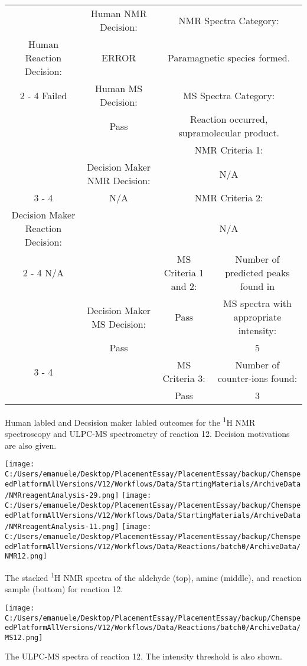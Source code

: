\documentclass{article}%
\begin{document}
\begin{Decision Table}[H]%
\begin{tabular}{|c|c|c|c|}%
\hline%
&Human NMR Decision:&\multicolumn{2}{|c|}{NMR Spectra Category:}\\%
Human Reaction Decision:&ERROR&\multicolumn{2}{|c|}{Paramagnetic species formed.}\\%
\cline{2%
-%
4}%
Failed&Human MS Decision:&\multicolumn{2}{|c|}{MS Spectra Category:}\\%
&Pass&\multicolumn{2}{|c|}{Reaction occurred, supramolecular product.}\\%
\hline%
&&\multicolumn{2}{|c|}{NMR Criteria 1:}\\%
&Decision Maker NMR Decision:&\multicolumn{2}{|c|}{N/A}\\%
\cline{3%
-%
4}%
&N/A&\multicolumn{2}{|c|}{NMR Criteria 2:}\\%
Decision Maker Reaction Decision:&&\multicolumn{2}{|c|}{N/A}\\%
\cline{2%
-%
4}%
N/A&&MS Criteria 1 and 2:&Number of predicted peaks found in\\%
&Decision Maker MS Decision:&Pass&MS spectra with appropriate intensity:\\%
&Pass&&5\\%
\cline{3%
-%
4}%
&&MS Criteria 3:&Number of counter{-}ions found:\\%
&&Pass&3\\%
\hline%
\end{tabular}%
\caption{Human labled and Decsision maker labled outcomes for the \textsuperscript{1}H NMR spectroscopy and ULPC-MS spectrometry of reaction 12. Decision motivations are also given.}%
\end{Decision Table}%
\begin{NMR Spectra}[H]%
\begin{center}%
\texttt{[image: C:/Users/emanuele/Desktop/PlacementEssay/PlacementEssay/backup/ChemspeedPlatformAllVersions/V12/Workflows/Data/StartingMaterials/ArchiveData/NMRreagentAnalysis-29.png]}\hfill%
\texttt{[image: C:/Users/emanuele/Desktop/PlacementEssay/PlacementEssay/backup/ChemspeedPlatformAllVersions/V12/Workflows/Data/StartingMaterials/ArchiveData/NMRreagentAnalysis-11.png]}\hfill%
\texttt{[image: C:/Users/emanuele/Desktop/PlacementEssay/PlacementEssay/backup/ChemspeedPlatformAllVersions/V12/Workflows/Data/Reactions/batch0/ArchiveData/NMR12.png]}\hfill%
\end{center}%
\caption{The stacked \textsuperscript{1}H NMR spectra of the aldehyde (top), amine (middle), and reaction sample (bottom) for reaction 12.}%
\end{NMR Spectra}%
\begin{MS Spectra}[H]%
\begin{center}%
\texttt{[image: C:/Users/emanuele/Desktop/PlacementEssay/PlacementEssay/backup/ChemspeedPlatformAllVersions/V12/Workflows/Data/Reactions/batch0/ArchiveData/MS12.png]}\hfill%
\end{center}%
\caption{The ULPC-MS spectra of reaction 12. The intensity threshold is also shown.}%
\end{MS Spectra}%
\end{document}
